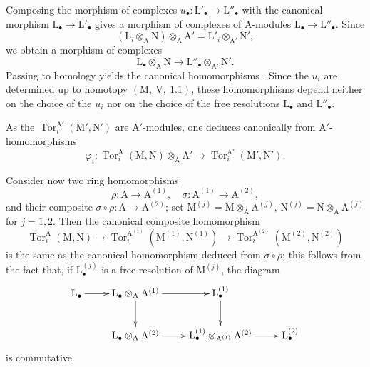 Composing the morphism of complexes
$u_\bullet:\mathrm{L}'_\bullet\to\mathrm{L}''_\bullet$ with the canonical
morphism $\mathrm{L}_\bullet\to\mathrm{L}'_\bullet$ gives a morphism of
complexes of $\mathrm{A}$-modules
$\mathrm{L}_\bullet\to\mathrm{L}''_\bullet$. Since
\[
  (\mathrm{L}_i\otimes_\mathrm{A}\mathrm{N})
    \otimes_\mathrm{A}\mathrm{A}'
  =\mathrm{L}'_i\otimes_{\mathrm{A}'}\mathrm{N}',
\]
we obtain a morphism of complexes
\[
  \mathrm{L}_\bullet\otimes_\mathrm{A}\mathrm{N}
  \longrightarrow
  \mathrm{L}''_\bullet\otimes_{\mathrm{A}'}\mathrm{N}'.
\]
Passing to homology yields the canonical homomorphisms
. Since the $u_i$ are determined up to
homotopy $(\mathrm{M},~\mathrm{V},~1.1)$, these homomorphisms depend
neither on the choice of the $u_i$ nor on the choice of the free
resolutions $\mathrm{L}_\bullet$ and $\mathrm{L}''_\bullet$.

As the $\operatorname{Tor}_i^{\mathrm{A}'}(\mathrm{M}',\mathrm{N}')$ are $\mathrm{A}'$-modules, one deduces canonically from  $\mathrm{A}'$-homomorphisms
\begin{equation}
  \varphi_i:\operatorname{Tor}_i^\mathrm{A}(\mathrm{M},\mathrm{N})\otimes_\mathrm{A}\mathrm{A}'\to\operatorname{Tor}_i^{\mathrm{A}'}(\mathrm{M}',\mathrm{N}').
  \label{IV.11.2.1.5}
\tag{11.2.1.5}
\end{equation}

Consider now two ring homomorphisms
\[
  \rho:\mathrm{A}\to\mathrm{A}^{(1)},\quad \sigma:\mathrm{A}^{(1)}\to\mathrm{A}^{(2)},
\]
and their composite $\sigma\circ\rho:\mathrm{A}\to\mathrm{A}^{(2)}$; set $\mathrm{M}^{(j)}=\mathrm{M}\otimes_\mathrm{A}\mathrm{A}^{(j)}$, $\mathrm{N}^{(j)}=\mathrm{N}\otimes_\mathrm{A}\mathrm{A}^{(j)}$ for $j=1,2$. Then the canonical composite homomorphism
\[
  \operatorname{Tor}_i^\mathrm{A}(\mathrm{M},\mathrm{N})
  \longrightarrow
  \operatorname{Tor}_i^{\mathrm{A}^{(1)}}
    (\mathrm{M}^{(1)},\mathrm{N}^{(1)})
  \longrightarrow
  \operatorname{Tor}_i^{\mathrm{A}^{(2)}}
    (\mathrm{M}^{(2)},\mathrm{N}^{(2)})
\]
is the same as the canonical homomorphism deduced from $\sigma\circ\rho$; this follows from the fact that, if $\mathrm{L}_\bullet^{(j)}$ is a free resolution of $\mathrm{M}^{(j)}$, the diagram
\[
\xymatrix{
  \mathrm{L}_\bullet \ar[r] & \mathrm{L}_\bullet\otimes_\mathrm{A}\mathrm{A}^{(1)} \ar[r] \ar[d] & \mathrm{L}_\bullet^{(1)} \ar[d] \\
  & \mathrm{L}_\bullet\otimes_\mathrm{A}\mathrm{A}^{(2)} \ar[r] &
  \mathrm{L}_\bullet^{(1)}\otimes_{\mathrm{A}^{(1)}}\mathrm{A}^{(2)} \ar[r] & \mathrm{L}_\bullet^{(2)}
}
\]
is commutative.


